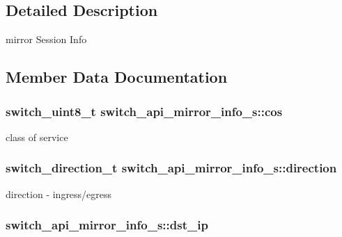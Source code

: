 \subsection{Detailed Description}
mirror Session Info 

\subsection{Member Data Documentation}
\hypertarget{structswitch__api__mirror__info__s_a05cf7979699265bac77b111c3777c717}{
\subsubsection[{cos}]{\setlength{\rightskip}{0pt plus 5cm}switch\+\_\+uint8\+\_\+t switch\+\_\+api\+\_\+mirror\+\_\+info\+\_\+s\+::cos}}\label{structswitch__api__mirror__info__s_a05cf7979699265bac77b111c3777c717}
class of service \hypertarget{structswitch__api__mirror__info__s_aabe4901c09dc2b839446f723d82cdd7a}{
\subsubsection[{direction}]{\setlength{\rightskip}{0pt plus 5cm}switch\+\_\+direction\+\_\+t switch\+\_\+api\+\_\+mirror\+\_\+info\+\_\+s\+::direction}}\label{structswitch__api__mirror__info__s_aabe4901c09dc2b839446f723d82cdd7a}
direction -\/ ingress/egress \hypertarget{structswitch__api__mirror__info__s_a864421edded9a8792cd846748c1b1574}{
\subsubsection[{dst\+\_\+ip}]{ switch\+\_\+api\+\_\+mirror\+\_\+info\+\_\+s\+::dst\+\_\+ip}}\label{structswitch__api__mirror__info__s_a864421edded9a8792cd846748c1b1574}
